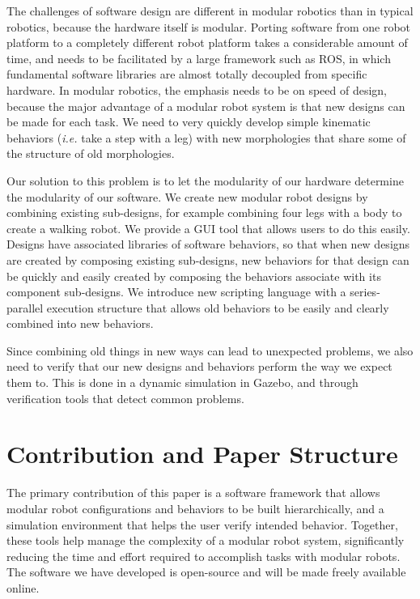 \documentclass[conference]{IEEEtran}
\theoremstyle{definition}
\begin{document}
The challenges of software design are different in modular robotics than
in typical robotics, because the hardware itself is modular. Porting software
from one robot platform to a completely different robot platform takes a
considerable amount of time, and needs to be facilitated by a large framework
such as ROS, in which fundamental software libraries are almost totally decoupled from
specific hardware. In modular robotics, the emphasis needs to be on speed of
design, because the major advantage of a modular robot system is that new
designs can be made for each task. We need to  very quickly develop simple kinematic
behaviors (\textit{i.e.} take a step with a leg) with new morphologies that share some of the
structure of old morphologies.

Our solution to this problem is to let the modularity of our hardware determine the
modularity of our software. We create new modular robot designs by combining existing sub-designs,
for example combining four legs with a body to create a walking robot.
We provide a GUI tool that allows users to do this easily. Designs have
associated libraries of software behaviors, so that when new designs are created
by composing existing sub-designs, new behaviors for that design can be quickly
and easily created by composing the behaviors associate with its component
sub-designs. We introduce new scripting language with a series-parallel
execution structure that allows old behaviors to be easily and clearly combined
into new behaviors.

Since combining old things in new ways can lead to unexpected problems, we also
need to verify that our new designs and behaviors perform the way we expect them
to. This is done in a dynamic simulation in Gazebo, and through
verification tools that detect common problems.


\section{Contribution and Paper Structure}

The primary contribution of this paper is a software framework that allows modular
robot configurations and behaviors to be built hierarchically, and a simulation
environment that helps the user verify intended behavior.  Together, these tools
help manage the complexity of a modular robot system, significantly reducing the
time and effort required to accomplish tasks with modular robots.  The software we
have developed is open-source and will be made freely available online.
\end{document}
